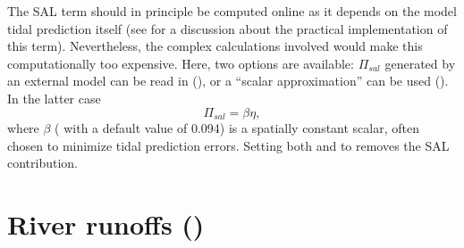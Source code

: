 \documentclass[../main/NEMO_manual]{subfiles}
\begin{document}
The SAL term should in principle be computed online as it depends on
the model tidal prediction itself (see \citet{arbic.garner.ea_DSR04} for a
discussion about the practical implementation of this term).
Nevertheless, the complex calculations involved would make this
computationally too expensive. Here, two options are available:
$\Pi_{sal}$ generated by an external model can be read in
(), or a ``scalar approximation'' can be
used (). In the latter case
\[
  \Pi_{sal} = \beta \eta,
\]
where $\beta$ ( with a default value of 0.094) is a
spatially constant scalar, often chosen to minimize tidal prediction
errors. Setting both  and  to
 removes the SAL contribution.

\section[River runoffs (\textit{sbcrnf.F90})]{River runoffs (\protect{})}
\label{sec:SBC_rnf}

\begin{listing}
  \caption{}
  \label{lst:namsbc_rnf}
\end{listing}


\end{document}
